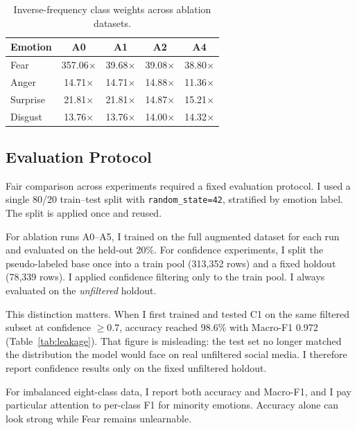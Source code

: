 \documentclass[11pt,a4paper]{article}
\begin{document}
\begin{table}[H]
\centering
\caption{Inverse-frequency class weights across ablation datasets.}
\label{tab:weights_progression}
\begin{tabular}{@{}lcccc@{}}
\toprule
Emotion & A0 & A1 & A2 & A4 \\
\midrule
Fear     & 357.06$\times$ & 39.68$\times$ & 39.08$\times$ & 38.80$\times$ \\
Anger    &  14.71$\times$ & 14.71$\times$ & 14.88$\times$ & 11.36$\times$ \\
Surprise &  21.81$\times$ & 21.81$\times$ & 14.87$\times$ & 15.21$\times$ \\
Disgust  &  13.76$\times$ & 13.76$\times$ & 14.00$\times$ & 14.32$\times$ \\
\bottomrule
\end{tabular}
\end{table}

\subsection{Evaluation Protocol}
\label{sec:eval-protocol}

Fair comparison across experiments required a fixed evaluation protocol. I used a single 80/20 train--test split with \texttt{random\_state=42}, stratified by emotion label. The split is applied once and reused.

For ablation runs A0--A5, I trained on the full augmented dataset for each run and evaluated on the held-out 20\%. For confidence experiments, I split the pseudo-labeled base once into a train pool (313,352 rows) and a fixed holdout (78,339 rows). I applied confidence filtering only to the train pool. I always evaluated on the \textit{unfiltered} holdout.

This distinction matters. When I first trained and tested C1 on the same filtered subset at confidence $\geq 0.7$, accuracy reached 98.6\% with Macro-F1 0.972 (Table~\ref{tab:leakage}). That figure is misleading: the test set no longer matched the distribution the model would face on real unfiltered social media. I therefore report confidence results only on the fixed unfiltered holdout.

For imbalanced eight-class data, I report both accuracy and Macro-F1, and I pay particular attention to per-class F1 for minority emotions. Accuracy alone can look strong while Fear remains unlearnable.

\end{document}
